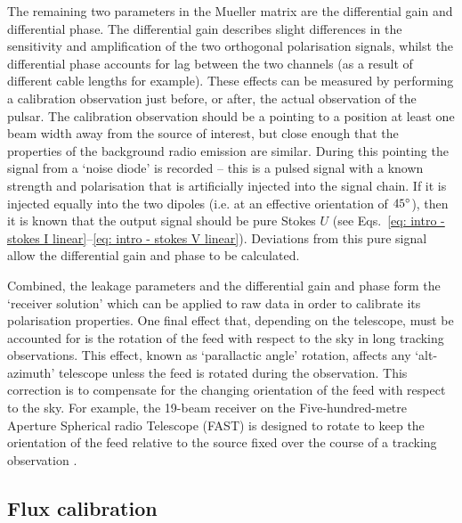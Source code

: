 The remaining two parameters in the Mueller matrix are the differential gain and differential phase. The differential gain describes slight differences in the sensitivity and amplification of the two orthogonal polarisation signals, whilst the differential phase accounts for lag between the two channels (as a result of different cable lengths for example). These effects can be measured by performing a calibration observation just before, or after, the actual observation of the pulsar. The calibration observation should be a pointing to a position at least one beam width away from the source of interest, but close enough that the properties of the background radio emission are similar. During this pointing the signal from a `noise diode' is recorded -- this is a pulsed signal with a known strength and polarisation that is artificially injected into the signal chain. If it is injected equally into the two dipoles (i.e. at an effective orientation of $45^\circ$), then it is known that the output signal should be pure Stokes $U$ (see Eqs.~\eqref{eq: intro - stokes I linear}--\eqref{eq: intro - stokes V linear}). Deviations from this pure signal allow the differential gain and phase to be calculated. 

Combined, the leakage parameters and the differential gain and phase form the `receiver solution' which can be applied to raw data in order to calibrate its polarisation properties. One final effect that, depending on the telescope, must be accounted for is the rotation of the feed with respect to the sky in long tracking observations. This effect, known as `parallactic angle' rotation, affects any `alt-azimuth' telescope unless the feed is rotated during the observation. This correction is to compensate for the changing orientation of the feed with respect to the sky. For example, the 19-beam receiver on the Five-hundred-metre Aperture Spherical radio Telescope (FAST) is designed to rotate to keep the orientation of the feed relative to the source fixed over the course of a tracking observation \citep[e.g.][]{JYG+2019}.


\subsection{Flux calibration}
\label{sec: intro - observation processing - flux calibration}

